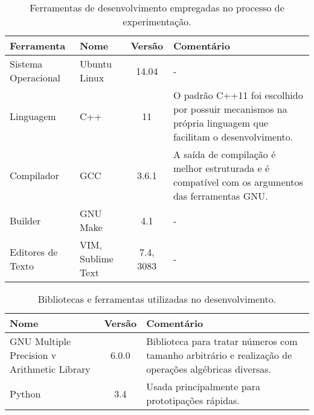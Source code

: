 %
%
\begin{table}[!ht]
\centering
    \begin{tabularx}{0.95\textwidth}{llcX}
    \toprule
        \textbf{Ferramenta} & {\textbf{Nome}} & \textbf{Versão} & \textbf{Comentário}  \\
    \midrule
        Sistema Operacional  & Ubuntu Linux      & 14.04     & -                                                                                                         \\ 
        \rowcolor[gray]{0.9}
        Linguagem            & C++               & 11        & O padrão C++11 foi escolhido por possuir mecanismos na própria linguagem que facilitam o desenvolvimento. \\
        Compilador           & GCC               & 3.6.1     & A saída de compilação é melhor estruturada e é compatível com os argumentos das ferramentas GNU.          \\
        \rowcolor[gray]{0.9}
        Builder              & GNU Make          & 4.1       & -                                                                                                         \\
        Editores de Texto    & VIM, Sublime Text & 7.4, 3083 & -                                                                                                         \\
    \bottomrule
    
    \end{tabularx}
\caption{Ferramentas de desenvolvimento empregadas no processo de experimentação.}
\label{table:tools}

\end{table}

%
%
%
\begin{table}[!ht]
\centering
    \begin{tabularx}{0.95\textwidth}{lcX}
    
    \toprule
        \textbf{Nome}  &  \textbf{Versão}  &  \textbf{Comentário}  \\
    \midrule
        GNU Multiple  Precision v Arithmetic Library & 6.0.0    & Biblioteca para tratar números com tamanho arbitrário e realização de operações algébricas diversas.  \\
        \rowcolor[gray]{0.9}
        Python                                       & 3.4      & Usada principalmente para prototipações rápidas.                                                      \\
    \bottomrule
    
    \end{tabularx}
\caption{Bibliotecas e ferramentas utilizadas no desenvolvimento.}
\label{table:libs}

\end{table}

